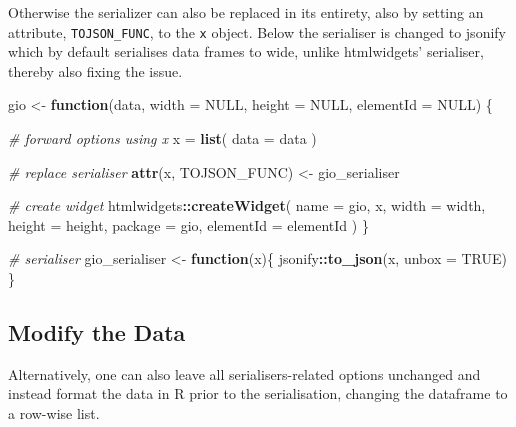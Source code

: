 \documentclass[
]{krantz}
\makeatletter
\newenvironment{Shaded}{\begin{snugshade}}{\end{snugshade}}
\newcommand{\CommentTok}[1]{\textcolor[rgb]{0.37,0.37,0.37}{\textit{#1}}}
\newcommand{\ControlFlowTok}[1]{\textcolor[rgb]{0.27,0.27,0.27}{\textbf{#1}}}
\newcommand{\DataTypeTok}[1]{\textcolor[rgb]{0.27,0.27,0.27}{#1}}
\newcommand{\KeywordTok}[1]{\textcolor[rgb]{0.27,0.27,0.27}{\textbf{#1}}}
\newcommand{\NormalTok}[1]{#1}
\newcommand{\OperatorTok}[1]{\textcolor[rgb]{0.43,0.43,0.43}{\textbf{#1}}}
\newcommand{\OtherTok}[1]{\textcolor[rgb]{0.37,0.37,0.37}{#1}}
\newcommand{\StringTok}[1]{\textcolor[rgb]{0.5,0.5,0.5}{#1}}
\newenvironment{kframe}{%
\medskip{}
\setlength{\fboxsep}{.8em}
 \def\at@end@of@kframe{}%
 \ifinner\ifhmode%
  \def\at@end@of@kframe{\end{minipage}}%
  \begin{minipage}{\columnwidth}%
 \fi\fi%
 \def\FrameCommand##1{\hskip\@totalleftmargin \hskip-\fboxsep
 \colorbox{shadecolor}{##1}\hskip-\fboxsep
     \hskip-\linewidth \hskip-\@totalleftmargin \hskip\columnwidth}%
 \MakeFramed {\advance\hsize-\width
   \@totalleftmargin\z@ \linewidth\hsize
   \@setminipage}}%
 {\par\unskip\endMakeFramed%
 \at@end@of@kframe}
\renewenvironment{Shaded}{\begin{kframe}}{\end{kframe}}
\makeatother
\begin{document}
Otherwise the serializer can also be replaced in its entirety, also by setting an attribute, \texttt{TOJSON\_FUNC}, to the \texttt{x} object. Below the serialiser is changed to jsonify \citep{R-jsonify} which by default serialises data frames to wide, unlike htmlwidgets' serialiser, thereby also fixing the issue.

\begin{Shaded}
\begin{Highlighting}[]
\NormalTok{gio <{-}}\StringTok{ }\ControlFlowTok{function}\NormalTok{(data, }\DataTypeTok{width =} \OtherTok{NULL}\NormalTok{, }\DataTypeTok{height =} \OtherTok{NULL}\NormalTok{, }
  \DataTypeTok{elementId =} \OtherTok{NULL}\NormalTok{) \{}

  \CommentTok{\# forward options using x}
\NormalTok{  x =}\StringTok{ }\KeywordTok{list}\NormalTok{(}
    \DataTypeTok{data =}\NormalTok{ data}
\NormalTok{  )}

  \CommentTok{\# replace serialiser}
  \KeywordTok{attr}\NormalTok{(x, }\StringTok{\textquotesingle{}TOJSON\_FUNC\textquotesingle{}}\NormalTok{) <{-}}\StringTok{ }\NormalTok{gio\_serialiser}

  \CommentTok{\# create widget}
\NormalTok{  htmlwidgets}\OperatorTok{::}\KeywordTok{createWidget}\NormalTok{(}
    \DataTypeTok{name =} \StringTok{\textquotesingle{}gio\textquotesingle{}}\NormalTok{,}
\NormalTok{    x,}
    \DataTypeTok{width =}\NormalTok{ width,}
    \DataTypeTok{height =}\NormalTok{ height,}
    \DataTypeTok{package =} \StringTok{\textquotesingle{}gio\textquotesingle{}}\NormalTok{,}
    \DataTypeTok{elementId =}\NormalTok{ elementId}
\NormalTok{  )}
\NormalTok{\}}

\CommentTok{\# serialiser}
\NormalTok{gio\_serialiser <{-}}\StringTok{ }\ControlFlowTok{function}\NormalTok{(x)\{}
\NormalTok{  jsonify}\OperatorTok{::}\KeywordTok{to\_json}\NormalTok{(x, }\DataTypeTok{unbox =} \OtherTok{TRUE}\NormalTok{)}
\NormalTok{\}}
\end{Highlighting}
\end{Shaded}

\hypertarget{widgets-full-transform-data-modify-data}{%
\subsection{Modify the Data}\label{widgets-full-transform-data-modify-data}}

Alternatively, one can also leave all serialisers-related options unchanged and instead format the data in R prior to the serialisation, changing the dataframe to a row-wise list.
\end{document}
